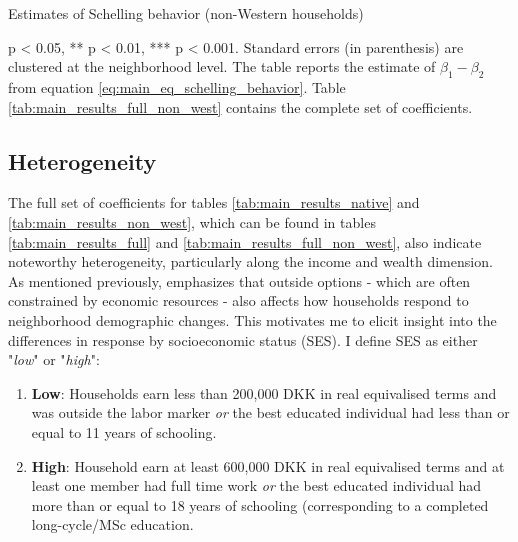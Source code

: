 \documentclass[../main.tex]{subfiles}
\begin{document}
\begin{table}[H]
    \caption{Estimates of Schelling behavior (non-Western households)}
    \label{tab:main_results_non_west}
    \begin{adjustbox}{width = \linewidth, center}
    
    \begin{threeparttable}
            
    \begin{tablenotes}[flushleft]
    \item \scriptsize * p < 0.05, ** p < 0.01, *** p < 0.001. Standard errors (in parenthesis) are clustered at the neighborhood level. The table reports the estimate of $\beta_1 - \beta_2$ from equation \ref{eq:main_eq_schelling_behavior}. Table \ref{tab:main_results_full_non_west} contains the complete set of coefficients.
    \end{tablenotes}
    \end{threeparttable}
    \end{adjustbox}    
\end{table}

\subsection{Heterogeneity}
The full set of coefficients for tables \ref{tab:main_results_native} and \ref{tab:main_results_non_west}, which can be found in tables \ref{tab:main_results_full} and \ref{tab:main_results_full_non_west}, also indicate noteworthy heterogeneity, particularly along the income and wealth dimension. As mentioned previously, \textcite{blair2017outside} emphasizes that outside options - which are often constrained by economic resources - also affects how households respond to neighborhood demographic changes. This motivates me to elicit insight into the differences in response by socioeconomic status (SES). I define SES as either "\textit{low}" or "\textit{high}": 

\begin{enumerate}
    \item \textbf{Low}: Households earn less than 200,000 DKK in real equivalised terms and was outside the labor marker \textit{or} the best educated individual had less than or equal to 11 years of schooling.
    \item \textbf{High}: Household earn at least 600,000 DKK in real equivalised terms and at least one member had full time work \textit{or} the best educated individual had more than or equal to 18 years of schooling (corresponding to a completed long-cycle/MSc education.
\end{enumerate}
\end{document}
